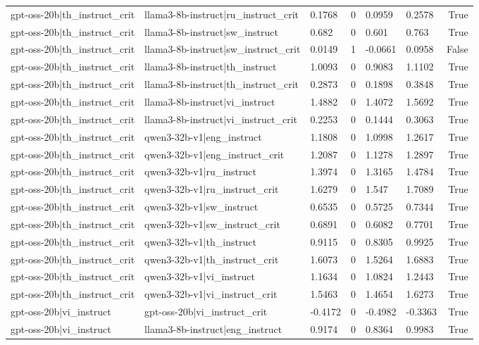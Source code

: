 \begin{table}
\begin{tabular}{llllllr}
gpt-oss-20b|th_instruct_crit & llama3-8b-instruct|ru_instruct_crit & 0.1768 & 0 & 0.0959 & 0.2578 & True \\
gpt-oss-20b|th_instruct_crit & llama3-8b-instruct|sw_instruct & 0.682 & 0 & 0.601 & 0.763 & True \\
gpt-oss-20b|th_instruct_crit & llama3-8b-instruct|sw_instruct_crit & 0.0149 & 1 & -0.0661 & 0.0958 & False \\
gpt-oss-20b|th_instruct_crit & llama3-8b-instruct|th_instruct & 1.0093 & 0 & 0.9083 & 1.1102 & True \\
gpt-oss-20b|th_instruct_crit & llama3-8b-instruct|th_instruct_crit & 0.2873 & 0 & 0.1898 & 0.3848 & True \\
gpt-oss-20b|th_instruct_crit & llama3-8b-instruct|vi_instruct & 1.4882 & 0 & 1.4072 & 1.5692 & True \\
gpt-oss-20b|th_instruct_crit & llama3-8b-instruct|vi_instruct_crit & 0.2253 & 0 & 0.1444 & 0.3063 & True \\
gpt-oss-20b|th_instruct_crit & qwen3-32b-v1|eng_instruct & 1.1808 & 0 & 1.0998 & 1.2617 & True \\
gpt-oss-20b|th_instruct_crit & qwen3-32b-v1|eng_instruct_crit & 1.2087 & 0 & 1.1278 & 1.2897 & True \\
gpt-oss-20b|th_instruct_crit & qwen3-32b-v1|ru_instruct & 1.3974 & 0 & 1.3165 & 1.4784 & True \\
gpt-oss-20b|th_instruct_crit & qwen3-32b-v1|ru_instruct_crit & 1.6279 & 0 & 1.547 & 1.7089 & True \\
gpt-oss-20b|th_instruct_crit & qwen3-32b-v1|sw_instruct & 0.6535 & 0 & 0.5725 & 0.7344 & True \\
gpt-oss-20b|th_instruct_crit & qwen3-32b-v1|sw_instruct_crit & 0.6891 & 0 & 0.6082 & 0.7701 & True \\
gpt-oss-20b|th_instruct_crit & qwen3-32b-v1|th_instruct & 0.9115 & 0 & 0.8305 & 0.9925 & True \\
gpt-oss-20b|th_instruct_crit & qwen3-32b-v1|th_instruct_crit & 1.6073 & 0 & 1.5264 & 1.6883 & True \\
gpt-oss-20b|th_instruct_crit & qwen3-32b-v1|vi_instruct & 1.1634 & 0 & 1.0824 & 1.2443 & True \\
gpt-oss-20b|th_instruct_crit & qwen3-32b-v1|vi_instruct_crit & 1.5463 & 0 & 1.4654 & 1.6273 & True \\
gpt-oss-20b|vi_instruct & gpt-oss-20b|vi_instruct_crit & -0.4172 & 0 & -0.4982 & -0.3363 & True \\
gpt-oss-20b|vi_instruct & llama3-8b-instruct|eng_instruct & 0.9174 & 0 & 0.8364 & 0.9983 & True \\

\end{tabular}
\end{table}
